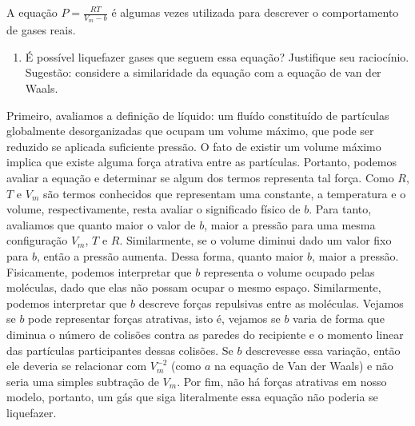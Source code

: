 \begin{xcs}
    A equação \( P = \frac{RT}{V_m - b} \) é algumas vezes utilizada para
    descrever o comportamento de gases reais. 
    \begin{enumerate}[label=\alph*.]
        \item É possível liquefazer gases que seguem essa equação? Justifique
            seu raciocínio. Sugestão: considere a similaridade da equação com a
            equação de van der Waals. 
    \end{enumerate}
\end{xcs}
\begin{rsl}
    Primeiro, avaliamos a definição de líquido: um fluído constituído de
    partículas globalmente desorganizadas que ocupam um volume máximo, que pode
    ser reduzido se aplicada suficiente pressão. O fato de existir um volume
    máximo implica que existe alguma força atrativa entre as partículas.
    Portanto, podemos avaliar a equação e determinar se algum dos termos
    representa tal força.  Como $R$, $T$ e $V_m$ são termos conhecidos que
    representam uma constante, a temperatura e o volume, respectivamente, resta
    avaliar o significado físico de $b$. Para tanto, avaliamos que quanto maior
    o valor de $b$, maior a pressão para uma mesma configuração $V_m$, $T$ e
    $R$. Similarmente, se o volume diminui dado um valor fixo para $b$, então a
    pressão aumenta. Dessa forma, quanto maior $b$, maior a pressão.
    Fisicamente, podemos interpretar que $b$ representa o volume ocupado pelas
    moléculas, dado que elas não possam ocupar o mesmo espaço. Similarmente,
    podemos interpretar que $b$ descreve forças repulsivas entre as moléculas.
    Vejamos se \( b \) pode representar forças atrativas, isto é, vejamos se \(
    b\) varia de forma que diminua o número de colisões contra as paredes do
    recipiente e o momento linear das partículas participantes dessas colisões.
    Se \( b \) descrevesse essa variação, então ele deveria se relacionar com \(
    V_m^{-2}\) (como \( a \) na equação de Van der Waals)  e não seria uma
    simples subtração de \( V_m \).
    Por fim, não há forças atrativas em nosso modelo, portanto, um gás que siga
    literalmente essa equação não poderia se liquefazer.      

\end{rsl}
